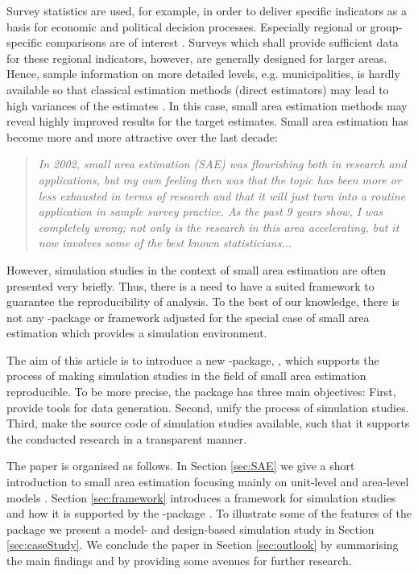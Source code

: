 \documentclass[article]{ajs}
\newcommand{\red}[1]{\color{red} #1 \color{black} }
\begin{document}
Survey statistics are used, for example, in order to deliver specific indicators as a basis for economic and political decision processes. Especially regional or group-specific comparisons are of interest \citep[cf.][]{Sch13}. Surveys which shall provide sufficient data for these regional indicators, however, are generally designed for larger areas. Hence, sample information on more detailed levels, e.g. municipalities, is hardly available so that classical estimation methods (direct estimators) may lead to high variances of the estimates \citep[cf.][]{Gho94}. In this case, small area estimation methods may reveal highly improved results for the target estimates. Small area estimation has become more and more attractive over the last decade: 

\begin{quote}
\textit{In 2002, small area estimation (SAE) was flourishing both in research and applications, but my own feeling then was that the topic has been more or less exhausted in terms of research and that it will just turn into a routine application in sample survey practice. As the past 9 years show, I was completely wrong; not only is the research in this area accelerating, but it now involves some of the best known statisticians...} \cite{pfeffermann13} 
\end{quote} 

However, simulation studies in the context of small area estimation \red{are} often presented very briefly. Thus, there is a need to have a suited framework to guarantee the reproducibility of analysis. To the best of our knowledge, there is not any -package or framework adjusted for the special case of small area estimation which provides a simulation environment.

The aim of this article is to introduce a new -package, , which supports the process of making simulation studies in the field of small area estimation reproducible. To be more precise, the package has three main objectives: First, provide tools for data generation. Second, unify the process of simulation studies. Third, make the source code of simulation studies available, such that it supports the conducted research in a transparent manner.

The paper is organised as follows. In Section \ref{sec:SAE} we give a short introduction to small area estimation focusing mainly on unit-level \citep{battese88} and area-level models \citep{fay79}. Section \ref{sec:framework} introduces a framework for simulation studies and how it is supported by the  -package . To illustrate some of the features of the package we present a model- and design-based simulation study in Section \ref{sec:caseStudy}. We conclude the paper in Section \ref{sec:outlook} by summarising the main findings and by providing some avenues for further research.
\end{document}
